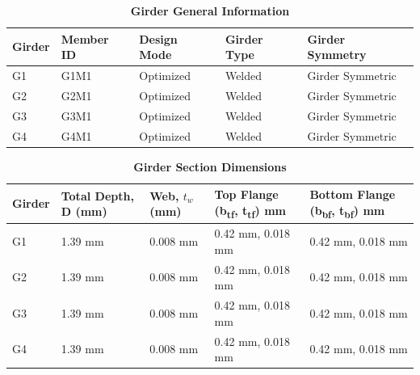 \documentclass[12pt,a4paper]{report}
\numberwithin{table}{chapter}
\numberwithin{figure}{chapter}
\begin{document}
\newpage

\vspace{0.4em}
\noindent
            
\vspace{4pt}
\begin{longtable}{|L{2.2cm}|L{1.8cm}|p{3.8cm}|p{3.8cm}|p{3.8cm}|}
\caption{\textbf{Girder General Information}}
\hline
\textbf{Girder} & \textbf{Member ID} & \textbf{Design Mode} & \textbf{Girder Type} & \textbf{Girder Symmetry} \\[6pt]
\hline
G1 & G1M1 & Optimized & Welded & Girder Symmetric \\[8pt]
\hline
G2 & G2M1 & Optimized & Welded & Girder Symmetric \\[8pt]
\hline
G3 & G3M1 & Optimized & Welded & Girder Symmetric \\[8pt]
\hline
G4 & G4M1 & Optimized & Welded & Girder Symmetric \\[8pt]
\hline
\end{longtable}

\vspace{0.6em}

\vspace{4pt}
\begin{longtable}{|L{1.8cm}|L{2.3cm}|L{1.8cm}|p{4.8cm}|p{4.8cm}|}
\caption{\textbf{Girder Section Dimensions}}
\hline
\textbf{Girder} & \textbf{Total Depth, D (mm)} & \textbf{Web, $t_w$ (mm)} & \textbf{Top Flange (b\textsubscript{tf}, t\textsubscript{tf}) mm} & \textbf{Bottom Flange (b\textsubscript{bf}, t\textsubscript{bf}) mm} \\[6pt]
\hline
G1 & 1.39 mm & 0.008 mm & 0.42 mm, 0.018 mm & 0.42 mm, 0.018 mm \\[8pt]
\hline
G2 & 1.39 mm & 0.008 mm & 0.42 mm, 0.018 mm & 0.42 mm, 0.018 mm \\[8pt]
\hline
G3 & 1.39 mm & 0.008 mm & 0.42 mm, 0.018 mm & 0.42 mm, 0.018 mm \\[8pt]
\hline
G4 & 1.39 mm & 0.008 mm & 0.42 mm, 0.018 mm & 0.42 mm, 0.018 mm \\[8pt]
\hline
\end{longtable}

\vspace{0.6em}
\end{document}
